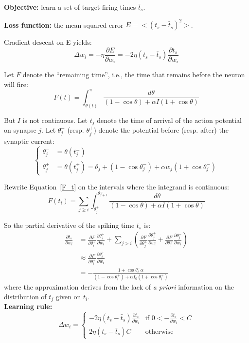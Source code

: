 \documentclass[final]{beamer}
\begin{document}
\begin{frame}[t]
\begin{multicols}{2}
\textbf{Objective:} learn a set of target firing times $\bar{t}_s$.

\textbf{Loss function:} the mean squared error $E=<(t_s - \bar{t}_s)^2>$.

Gradient descent on E yields:
\begin{equation}
	\Delta w_i = -\eta \frac{\partial E}{\partial w_i} = -2\eta(t_s - \bar{t}_s)\frac{\partial t_s}{\partial w_i}
\end{equation}

Let $F$ denote the ``remaining time'', i.e., the time that remains before the neuron will fire:
\begin{equation}
\label{F_t}
	F(t) = \int_{\theta(t)}^\pi \frac{d \theta}{(1-\cos \theta) + \alpha I (1 + \cos \theta)}
\end{equation}

But $I$ is not continuous. Let $t_j$ denote the time of arrival of the action potential on synapse $j$. 
Let $\theta_j^-$ (resp. $\theta_j^+$) denote the potential before (resp. after)  the synaptic current:
\begin{equation}
\left\{ \begin{array}{ll}
 \theta_j^- &= \theta(t_j^-) \\
\theta_j^+ &= \theta(t_j^+) = \theta_j +  (1 - \cos \theta_j^-) +\alpha w_j (1 + \cos \theta_j^-) 
  \end{array} \right.
\end{equation}

Rewrite Equation~\ref{F_t} on the intervals where the integrand is continuous:
\begin{equation}
	F(t_i) = \sum_{j \geq i}\int_{\theta_j^+}^{\theta_{j+1}^-} \frac{d \theta}{(1-\cos \theta) + \alpha I (1 + \cos \theta)}
\end{equation}

So the partial derivative of the spiking time $t_s$ is:
\begin{align}
\frac{\partial t_s}{\partial w_i} 
&= \frac{\partial F}{\partial \theta_i^+} \frac{\partial \theta_i^+}{\partial w_i} + \sum_{j > i} (
\frac{\partial F}{\partial \theta_j^+} \frac{\partial \theta_j^+}{\partial w_i} + 
\frac{\partial F}{\partial \theta_j^-} \frac{\partial \theta_j^-}{\partial w_i})\\
&\approx \frac{\partial F}{\partial \theta_i^+} \frac{\partial \theta_i^+}{\partial w_i}\\
&= -\frac{1+\cos \theta_i^- \alpha} {(1 - \cos \theta_i^+) + \alpha I_0(1 + \cos \theta_i^+)}
\end{align}
where the approximation derives from the lack of \emph{a priori} information on the distribution of $t_j$ given on $t_i$.\\
\textbf{Learning rule:}
\begin{equation}
\Delta w_i =
\left\{ \begin{array}{lr}
 -2\eta (t_s - \bar{t}_s) \frac{\partial t_s}{\partial w_i} & \text{if } 0 < - \frac{\partial t_s}{\partial w_i}  < C\\
2\eta (t_s - \bar{t}_s) C & \text{otherwise}
  \end{array} \right.
\end{equation}


\end{multicols}
\end{frame}
\end{document}
